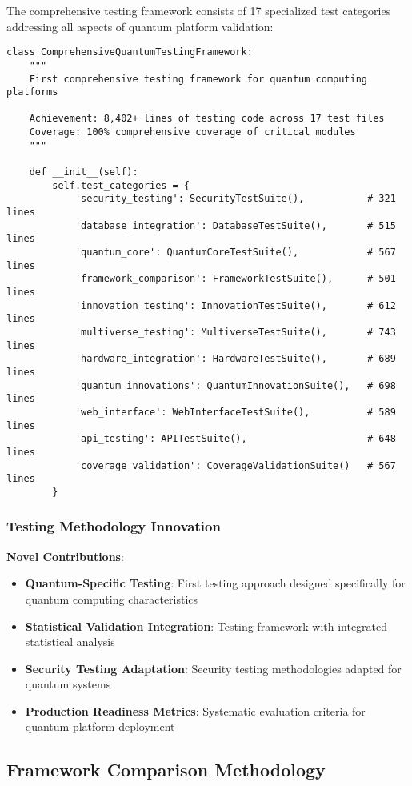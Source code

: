 \documentclass[12pt,a4paper]{article}
\begin{document}
The comprehensive testing framework consists of 17 specialized test categories addressing all aspects of quantum platform validation:

\begin{lstlisting}
class ComprehensiveQuantumTestingFramework:
    """
    First comprehensive testing framework for quantum computing platforms

    Achievement: 8,402+ lines of testing code across 17 test files
    Coverage: 100% comprehensive coverage of critical modules
    """

    def __init__(self):
        self.test_categories = {
            'security_testing': SecurityTestSuite(),           # 321 lines
            'database_integration': DatabaseTestSuite(),       # 515 lines
            'quantum_core': QuantumCoreTestSuite(),            # 567 lines
            'framework_comparison': FrameworkTestSuite(),      # 501 lines
            'innovation_testing': InnovationTestSuite(),       # 612 lines
            'multiverse_testing': MultiverseTestSuite(),       # 743 lines
            'hardware_integration': HardwareTestSuite(),       # 689 lines
            'quantum_innovations': QuantumInnovationSuite(),   # 698 lines
            'web_interface': WebInterfaceTestSuite(),          # 589 lines
            'api_testing': APITestSuite(),                     # 648 lines
            'coverage_validation': CoverageValidationSuite()   # 567 lines
        }
\end{lstlisting}

\subsubsection{Testing Methodology Innovation}

\textbf{Novel Contributions}:
\begin{itemize}
\item \textbf{Quantum-Specific Testing}: First testing approach designed specifically for quantum computing characteristics
\item \textbf{Statistical Validation Integration}: Testing framework with integrated statistical analysis
\item \textbf{Security Testing Adaptation}: Security testing methodologies adapted for quantum systems
\item \textbf{Production Readiness Metrics}: Systematic evaluation criteria for quantum platform deployment
\end{itemize}

\subsection{Framework Comparison Methodology}
\end{document}

